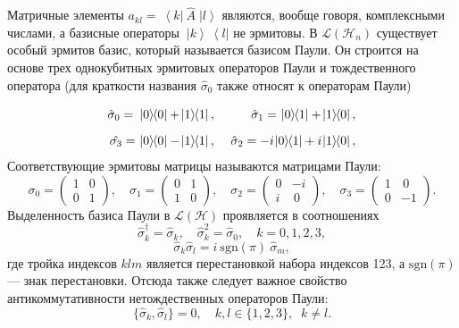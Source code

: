 \documentclass[a4paper]{report}
\newcommand{\ket}[1] {\!\!\;\ensuremath{\left|#1\right\rangle}}
\newcommand{\bra}[1] {\!\!\:\ensuremath{\left\langle#1\right|\!\!\:}}
\newcommand{\ketbra}[2]{\!\!\:\ensuremath {\left|#1\right\rangle\!\:\!\!\left\langle#2\right|}}
\begin{document}
Матричные элементы $a_{kl}=\bra{k}\hat{A}\ket{l}$ являются, вообще говоря, комплексными числами, а базисные операторы $\ketbra{k}{l}$ не эрмитовы. В ${\mathcal{L}(\mathcal{H}_n)}$ существует особый эрмитов базис, который называется базисом Паули. Он строится на основе трех однокубитных эрмитовых операторов Паули и тождественного оператора (для краткости названия $\hat{\sigma}_0$ также относят к операторам Паули)
\begin{eqnarray}\label{}
\hat{\sigma}_0=\,\vphantom{\int} \ketbra00+\ketbra11, \!\!&\quad&\!\! \hat{\sigma}_1=\,\ketbra01+\ketbra10,
\label{sigma-1}\\
\hat{\sigma_3}=\,\ketbra00-\ketbra11,  \!\!&\quad&\!\! \hat{\sigma}_2=-i\ketbra01+i\ketbra10, \label{sigma-2}
\end{eqnarray}
Соответствующие эрмитовы матрицы называются матрицами Паули:
\begin{equation}\label{matr-Pauli}
\sigma_0=
\left(\!\!
\begin{array}{cc} 1&0 \\[4pt] 0&1 \end{array}
\!\!\right)\!,\quad
\sigma_1=
\left(\!\!
\begin{array}{cc} 0&1 \\[4pt] 1&0 \end{array}
\!\!\right)\!,\quad
\sigma_2=
\left(\!\!
\begin{array}{cc} 0&-i \\[4pt] i&\,0 \end{array}
\!\!\right)\!,\quad
\sigma_3=
\left(\!\!
\begin{array}{cc} 1&\,0 \\[4pt] 0&-1 \end{array}
\!\!\right)\!.
\nonumber
\end{equation}
Выделенность базиса Паули в ${\mathcal{L}(\mathcal{H})}$ проявляется в соотношениях
\begin{equation*}
\hat{\sigma}_k^\dag= \hat{\sigma}_k,\quad
\hat{\sigma}_k^2= \hat{\sigma}_0,\quad k=0,1,2,3,
\end{equation*}
\begin{equation*}
\hat{\sigma}_k\hat{\sigma}_l= i\:\!\mathrm{sgn}(\pi)\:\!\hat{\sigma}_m,
\end{equation*}
где тройка индексов ${klm}$ является перестановкой набора индексов 123, а $\mathrm{sgn}(\pi)$ --- знак перестановки. Отсюда также следует важное свойство антикоммутативности нетождественных операторов Паули:
\begin{equation*}
\big\{\hat{\sigma}_k,\hat{\sigma}_l\big\}=0, \quad k,l\in\{1,2,3\},\;\; k\neq l.
\end{equation*}
\end{document}
